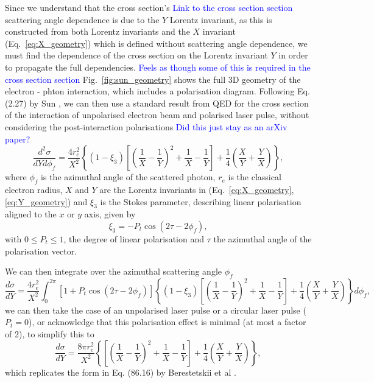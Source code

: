 \documentclass[../main.tex]{subfiles}
\begin{document}
Since we understand that the cross section's \textcolor{blue}{Link to the cross section section} scattering angle dependence is due to the $Y$ Lorentz invariant, as this is constructed from both Lorentz invariants and the $X$ invariant (Eq.~\ref{eq:X_geometry}) which is defined without scattering angle dependence, we must find the dependence of the cross section on the Lorentz invariant $Y$ in order to propagate the full dependencies. \textcolor{blue}{Feels as though some of this is required in the cross section section} Fig.~\ref{fig:sun_geometry} shows the full 3D geometry of the electron - phton interaction, which includes a polarisation diagram. Following Eq. (2.27) by Sun \cite{sun2009characterizations}, we can then use a standard result from QED for the cross section of the interaction of unpolarised electron beam and polarised laser pulse, without considering the post-interaction polarisations \cite{grozin2002complete} \textcolor{blue}{Did this just stay as an arXiv paper?}
\begin{equation}
\frac{d^{2}\sigma}{dYd\phi_{f}} = \frac{4r_{e}^{2}}{X^{2}}\left\{\left(1-\xi_{3}\right)\left[\left(\frac{1}{X}-\frac{1}{Y}\right)^{2}+\frac{1}{X}-\frac{1}{Y}\right]+\frac{1}{4}\left(\frac{X}{Y}+\frac{Y}{X}\right)\right\},
\label{eq:differential_cross_section_Y_phif}
\end{equation}
where $\phi_{f}$ is the azimuthal angle of the scattered photon, $r_{e}$ is the classical electron radius, $X$ and $Y$ are the Lorentz invariants in (Eq.~\ref{eq:X_geometry}, \ref{eq:Y_geometry}) and $\xi_{3}$ is the Stokes parameter, describing linear polarisation aligned to the $x$ or $y$ axis, given by
\begin{equation}
\xi_{3} = -P_{t}\cos\left(2\tau-2\phi_{f}\right),
\label{eq:stokes_3}
\end{equation} 
with $0 \leq P_{t} \leq 1$, the degree of linear polarisation and $\tau$ the azimuthal angle of the polarisation vector. 

We can then integrate over the azimuthal scattering angle $\phi_{f}$
\begin{equation}
\frac{d\sigma}{dY} = \frac{4r_{e}^{2}}{X^{2}}\int_{0}^{2\pi}\left[1+P_{t}\cos\left(2\tau-2\phi_{f}\right)\right]\left\{\left(1-\xi_{3}\right)\left[\left(\frac{1}{X}-\frac{1}{Y}\right)^{2}+\frac{1}{X}-\frac{1}{Y}\right]+\frac{1}{4}\left(\frac{X}{Y}+\frac{Y}{X}\right)\right\} d\phi_{f}, 
\label{eq:phif_integral}
\end{equation}
we can then take the case of an unpolarised laser pulse or a circular laser pulse ($P_{t} = 0$), or acknowledge that this polarisation effect is minimal (at most a factor of 2), to simplify this to
\begin{equation}
\frac{d\sigma}{dY} = \frac{8\pi r_{e}^{2}}{X^{2}}\left\{\left[\left(\frac{1}{X}-\frac{1}{Y}\right)^{2}+\frac{1}{X}-\frac{1}{Y}\right]+\frac{1}{4}\left(\frac{X}{Y}+\frac{Y}{X}\right)\right\},
\label{eq:cross_section_Y_berestetskii_form}
\end{equation}
which replicates the form in Eq. (86.16) by Berestetskii et al \cite{berestetskii1982quantum}.
\end{document}
